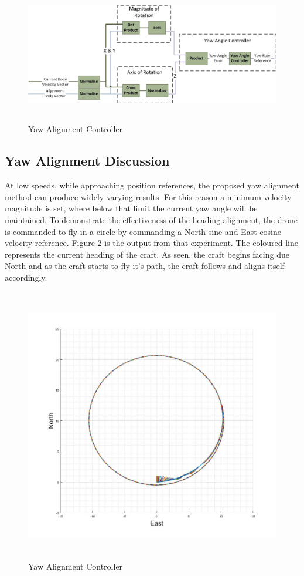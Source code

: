 		\begin{figure}[H]
			\centering
			\includegraphics[height = 6cm]{../References/Diagrams/YawAlignmentController.jpg}     
			\caption{Yaw Alignment Controller}
			\label{IM_YawAlignmentController}
		\end{figure}
		
		\subsection{Yaw Alignment Discussion}
		At low speeds, while approaching position references, the proposed yaw alignment method can produce widely varying results. For this reason a minimum velocity magnitude is set, where below that limit the current yaw angle will be maintained. To demonstrate the effectiveness of the heading alignment, the drone is commanded to fly in a circle by commanding a North sine and East cosine velocity reference. Figure \ref{IM_YawAlignmentCircle} is the output from that experiment. The coloured line represents the current heading of the craft. As seen, the craft begins facing due North and as the craft starts to fly it's path, the craft follows and aligns itself accordingly.
		
		\begin{figure}[H]
			\centering
			\includegraphics[height = 12cm]{../References/Diagrams/YawAlignmentCirc.jpg}     
			\caption{Yaw Alignment Controller}
			\label{IM_YawAlignmentCircle}
		\end{figure}
		
